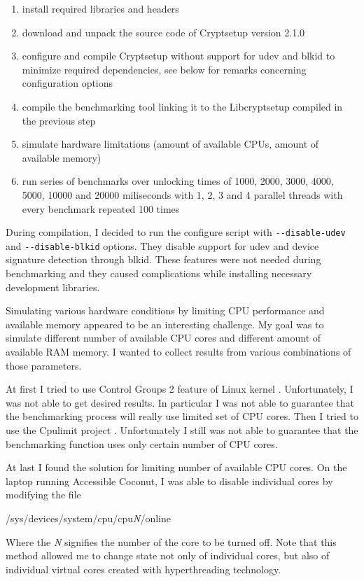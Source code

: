 \documentclass[nolof]{fithesis3}
\begin{document}
\begin{enumerate}
\item install required libraries and headers

\item download and unpack the source code of Cryptsetup version 2.1.0

\item configure and compile Cryptsetup without support for udev and blkid to minimize required dependencies, see below for remarks concerning configuration options

\item compile the benchmarking tool linking it to the Libcryptsetup compiled in the previous step

\item simulate hardware limitations (amount of available CPUs, amount of available memory)

\item run series of benchmarks over unlocking times of 1000, 2000, 3000, 4000, 5000, 10000 and 20000 miliseconds with 1, 2, 3 and 4 parallel threads with every benchmark repeated 100 times
\end{enumerate}

During compilation, I decided to run the configure script with \verb+--disable-udev+ and \verb+--disable-blkid+ options. They disable support for udev and device signature detection through blkid. These features were not needed during benchmarking and they caused complications while installing necessary development libraries.

Simulating various hardware conditions by limiting CPU performance and available memory appeared to be an interesting challenge. My goal was to simulate different number of available CPU cores and different amount of available RAM memory. I wanted to collect results from various combinations of those parameters.

At first I tried to use Control Groups 2 feature of Linux kernel \parencite{cgroups2}. Unfortunately, I was not able to get desired results. In particular I was not able to guarantee that the benchmarking process will really use limited set of CPU cores. Then I tried to use the Cpulimit project \parencite{cpulimit}. Unfortunately I still was not able to guarantee that the benchmarking function uses only certain number of CPU cores.

At last I found the solution for limiting number of available CPU cores. On the laptop running Accessible Coconut, I was able to disable individual cores by modifying the file 
\begin{tt}
/sys/devices/system/cpu/cpu\emph{N}/online
\end{tt}
 Where the \emph{N} signifies the number of the core to be turned off. Note that this method allowed me to change state not only of individual cores, but also of individual virtual cores created with hyperthreading technology.
\end{document}
